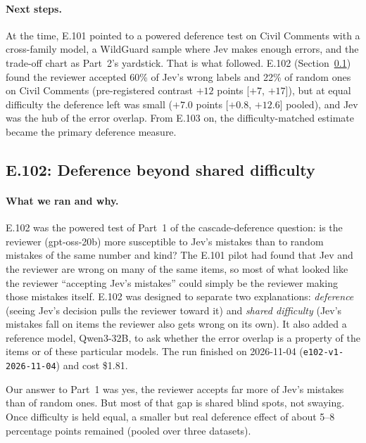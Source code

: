 \documentclass[11pt]{article}
\renewcommand{\_}{\origunderscore\allowbreak}
\begin{document}
\paragraph{Next steps.}
At the time, E.101 pointed to a powered deference test on Civil Comments with a cross-family model, a WildGuard sample where Jev makes enough errors, and the trade-off chart as Part~2's yardstick. That is what followed. E.102 (Section~\ref{sec:e102}) found the reviewer accepted 60\% of Jev's wrong labels and 22\% of random ones on Civil Comments (pre-registered contrast $+12$ points [$+7$, $+17$]), but at equal difficulty the deference left was small ($+7.0$ points [$+0.8$, $+12.6$] pooled), and Jev was the hub of the error overlap. From E.103 on, the difficulty-matched estimate became the primary deference measure.

\subsection{E.102: Deference beyond shared difficulty}\label{sec:e102}

\paragraph{What we ran and why.}
E.102 was the powered test of Part~1 of the cascade-deference question: is the reviewer (gpt-oss-20b) more susceptible to Jev's mistakes than to random mistakes of the same number and kind? The E.101 pilot had found that Jev and the reviewer are wrong on many of the same items, so most of what looked like the reviewer ``accepting Jev's mistakes'' could simply be the reviewer making those mistakes itself. E.102 was designed to separate two explanations: \emph{deference} (seeing Jev's decision pulls the reviewer toward it) and \emph{shared difficulty} (Jev's mistakes fall on items the reviewer also gets wrong on its own). It also added a reference model, Qwen3-32B, to ask whether the error overlap is a property of the items or of these particular models. The run finished on 2026-11-04 (\texttt{e102-v1-2026-11-04}) and cost \$1.81.

Our answer to Part~1 was yes, the reviewer accepts far more of Jev's mistakes than of random ones. But most of that gap is shared blind spots, not swaying. Once difficulty is held equal, a smaller but real deference effect of about 5--8 percentage points remained (pooled over three datasets).
\end{document}
